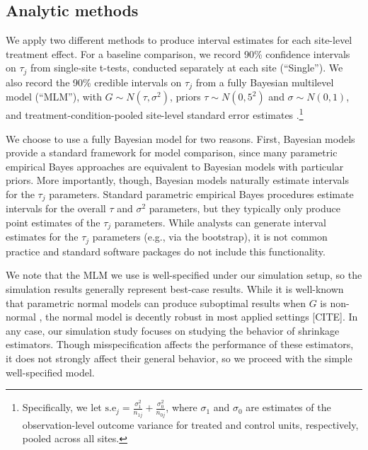\documentclass[]{article}
\begin{document}


\subsection{Analytic methods}

We apply two different methods to produce interval estimates for each site-level treatment effect.
For a baseline comparison, we record 90\% confidence intervals on $\tau_j$ from single-site t-tests, conducted separately at each site (``Single'').
We also record the 90\% credible intervals on $\tau_j$ from a fully Bayesian multilevel model (``MLM''), with $G \sim N(\tau, \sigma^2)$, priors $\tau \sim N(0,5^2)$ and $\sigma \sim N(0,1)$, and treatment-condition-pooled site-level standard error estimates \citep{bloom2017using}.\footnote{Specifically, we let $\text{s.e}_j = \frac{\sigma_1^2}{n_{1j}} + \frac{\sigma_0^2}{n_{0j}}$, where $\sigma_{1}$ and $\sigma_{0}$ are estimates of the observation-level outcome variance for treated and control units, respectively, pooled across all sites.}

We choose to use a fully Bayesian model for two reasons.
First, Bayesian models provide a standard framework for model comparison, since many parametric empirical Bayes approaches are equivalent to Bayesian models with particular priors.
More importantly, though, Bayesian models naturally estimate intervals for the $\tau_j$ parameters.
Standard parametric empirical Bayes procedures estimate intervals for the overall $\tau$ and $\sigma^2$ parameters, but they typically only produce point estimates of the $\tau_j$ parameters.
While analysts can generate interval estimates for the $\tau_j$ parameters (e.g., via the bootstrap), it is not common practice and standard software packages do not include this functionality.

We note that the MLM we use is well-specified under our simulation setup, so the simulation results generally represent best-case results.
While it is well-known that parametric normal models can produce suboptimal results when $G$ is non-normal \citep{armstrong2020robust}, the normal model is decently robust in most applied settings [CITE].
In any case, our simulation study focuses on studying the behavior of shrinkage estimators.
Though misspecification affects the performance of these estimators, it does not strongly affect their general behavior, so we proceed with the simple well-specified model.
\end{document}
